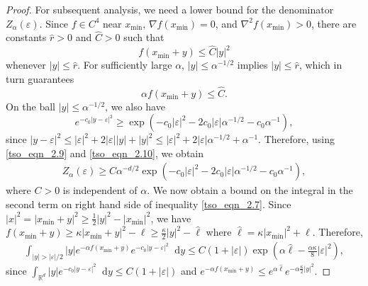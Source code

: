 \documentclass{article}
\newcommand*\der{\mathop{}\!\mathrm{d}}
\numberwithin{equation}{section}
\begin{document}
\begin{proof}
For subsequent analysis, we need a lower bound for the denominator $Z_\alpha(\varepsilon)$. Since $f \in C^4$ near $x_{\min}$, $\nabla f(x_{\min}) = 0$, and $\nabla^2 f(x_{\min}) > 0$, there are constants $\hat{r} > 0$ and $ \hat{C} > 0$ such that
\begin{equation}\label{tso_eqn_2.8}
f(x_{\min} + y) \leq \hat C |y|^2 
\end{equation}
whenever $|y| \leq \hat{r}$. For sufficiently large $\alpha$, $|y| \le \alpha^{-1/2}$ implies $|y| \le \hat r$, which in turn guarantees
\begin{equation}\label{tso_eqn_2.9}
\alpha f(x_{\min} + y) \leq \hat{C}. 
\end{equation}
On the ball $|y| \leq \alpha^{-1/2}$, we also have 
\begin{equation} \label{tso_eqn_2.10}
e^{-c_0|y-\varepsilon|^2} \geq \exp\left(-c_0|\varepsilon|^2 - 2c_0|\varepsilon|\alpha^{-1/2} - c_0\alpha^{-1}\right),
\end{equation}
since $|y - \varepsilon|^{2} \leq |\varepsilon|^{2} + 2|\varepsilon||y| + |y|^2 \leq |\varepsilon|^2 + 2|\varepsilon|\alpha^{-1/2} + \alpha^{-1}$. Therefore, using \eqref{tso_eqn_2.9} and \eqref{tso_eqn_2.10}, we obtain
\begin{align}\label{tso_eqn_2.11}
Z_\alpha(\varepsilon) \geq C\alpha^{-d/2} \exp\left(- c_0|\varepsilon|^2 - 2c_0|\varepsilon|\alpha^{-1/2} - c_0\alpha^{-1}\right),
\end{align}
where $C>0$ is independent of $\alpha$.  We now obtain a bound on the integral in the second term on right hand side of inequality \eqref{tso_eqn_2.7}. 
Since $|x|^2 = |x_{\min} + y|^2 \geq \frac{1}{2}|y|^2 - |x_{\min}|^2$, we have $f(x_{\min} + y) \geq \kappa |x_{\min} + y|^2 - \ell \ge \frac{\kappa}{2}|y|^2 - \hat{\ell}$ where $\hat{\ell} = \kappa |x_{\min}|^2 + \ell$. 
Therefore,
\begin{align}\label{tso_eqn_2.12}
 \int_{|y| > |\varepsilon| /2} |y| e^{-\alpha f(x_{\min} + y)} e^{-c_0|y - \varepsilon|^2} \der y \le C(1 + |\varepsilon|) \exp\left(\alpha \hat{\ell} - \frac{\alpha \kappa}{8}|\varepsilon|^2\right), 
\end{align} 
since $ \int_{\mathbb{R}^d} |y| e^{-c_0|y - \varepsilon|^2} \der y \le C(1 + |\varepsilon|)$ and $e^{-\alpha f(x_{\min} + y)} \leq e^{\alpha \hat{\ell}} e^{-\alpha \frac{\kappa}{2}| y|^2 }$.

\end{proof}
\end{document}
